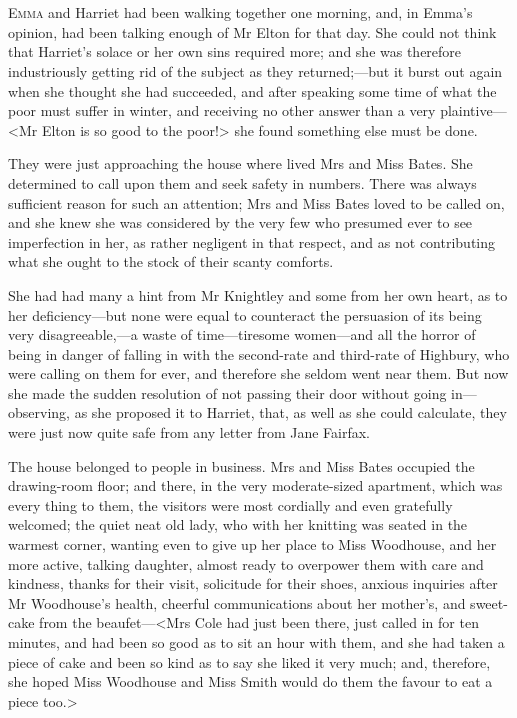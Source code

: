 \chapter[Chapter \thechapter]{}
\lettrine[lraise=0.3]{E}{mma} and Harriet had been walking together one morning, and, in Emma's opinion, had been talking enough of Mr Elton for that day. She could not think that Harriet's solace or her own sins required more; and she was therefore industriously getting rid of the subject as they returned;—but it burst out again when she thought she had succeeded, and after speaking some time of what the poor must suffer in winter, and receiving no other answer than a very plaintive—<Mr Elton is so good to the poor!> she found something else must be done.

They were just approaching the house where lived Mrs and Miss Bates. She determined to call upon them and seek safety in numbers. There was always sufficient reason for such an attention; Mrs and Miss Bates loved to be called on, and she knew she was considered by the very few who presumed ever to see imperfection in her, as rather negligent in that respect, and as not contributing what she ought to the stock of their scanty comforts.

She had had many a hint from Mr Knightley and some from her own heart, as to her deficiency—but none were equal to counteract the persuasion of its being very disagreeable,—a waste of time—tiresome women—and all the horror of being in danger of falling in with the second-rate and third-rate of Highbury, who were calling on them for ever, and therefore she seldom went near them. But now she made the sudden resolution of not passing their door without going in—observing, as she proposed it to Harriet, that, as well as she could calculate, they were just now quite safe from any letter from Jane Fairfax.

The house belonged to people in business. Mrs and Miss Bates occupied the drawing-room floor; and there, in the very moderate-sized apartment, which was every thing to them, the visitors were most cordially and even gratefully welcomed; the quiet neat old lady, who with her knitting was seated in the warmest corner, wanting even to give up her place to Miss Woodhouse, and her more active, talking daughter, almost ready to overpower them with care and kindness, thanks for their visit, solicitude for their shoes, anxious inquiries after Mr Woodhouse's health, cheerful communications about her mother's, and sweet-cake from the beaufet—<Mrs Cole had just been there, just called in for ten minutes, and had been so good as to sit an hour with them, and she had taken a piece of cake and been so kind as to say she liked it very much; and, therefore, she hoped Miss Woodhouse and Miss Smith would do them the favour to eat a piece too.>

